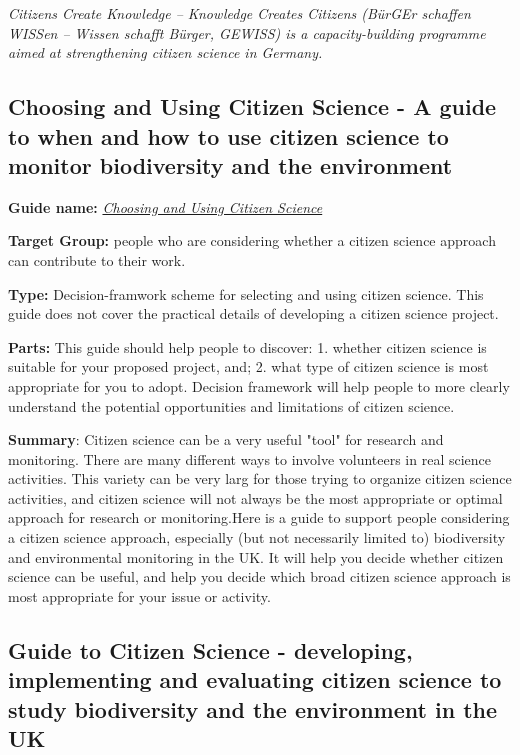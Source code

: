 \documentclass{article}
\begin{document}
\emph{Citizens Create Knowledge – Knowledge Creates Citizens (BürGEr schaffen WISSen – Wissen schafft Bürger, GEWISS) is a capacity-building programme aimed at strengthening citizen science in Germany.}


\subsection{Choosing and Using Citizen Science - A guide to when and how to use citizen science to monitor biodiversity and the environment}\label{H1285339}



\textbf{Guide name: }\emph{\href{https://www.ceh.ac.uk/sites/default/files/sepa_choosingandusingcitizenscience_interactive_4web_final_amended-blue1.pdf}{Choosing and Using Citizen Science}} \autocite{pocock_choosing_2014}


\textbf{Target Group: }people who are considering whether a citizen science approach can contribute to their work.


\textbf{Type: }Decision-framwork scheme for selecting and using citizen science. This guide does not cover the practical details of developing a citizen science project.


\textbf{Parts: }This guide should help people to discover:  1. whether citizen science is suitable for your proposed project, and;  2. what type of citizen science is most appropriate for you to adopt. Decision framework will help people to more clearly understand the potential opportunities and limitations of citizen science.


\textbf{Summary}: Citizen science can be a very useful "tool" for research and monitoring. There are many different ways to involve volunteers in real science activities. This variety can be very larg for those trying to organize citizen science activities, and citizen science will not always be the most appropriate or optimal approach for research or monitoring.Here is a guide to support people considering a citizen science approach, especially (but not necessarily limited to) biodiversity and environmental monitoring in the UK. It will help you decide whether citizen science can be useful, and help you decide which broad citizen science approach is most appropriate for your issue or activity. 


\subsection{Guide to Citizen Science - developing, implementing and evaluating citizen science to study biodiversity and the environment in the UK}\label{H3514415}
\end{document}
